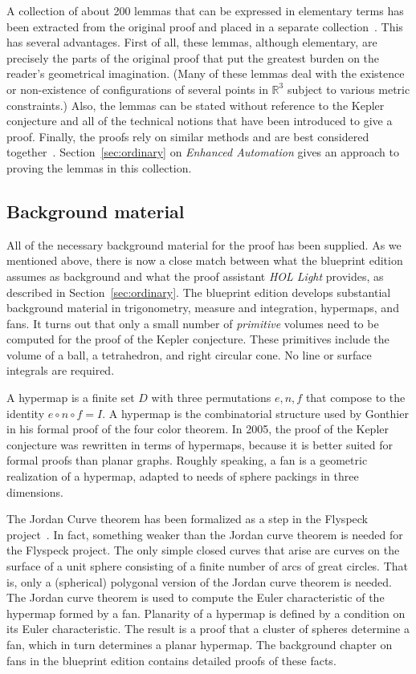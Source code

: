 \documentclass[11pt]{amsart}
\newcommand{\ring}[1]{\mathbb{#1}}
\begin{document}
A collection of about 200 lemmas that can be expressed in elementary terms has been extracted from 
the original proof and placed in a separate collection~\cite{hales:2008:collection}.  This has
several advantages.  First of all, these lemmas, although elementary, are precisely the parts of the
original proof that put the greatest burden on the reader's geometrical imagination.  (Many of these
lemmas deal with the existence or non-existence of configurations of several points in $\ring{R}^3$ subject to
various metric constraints.)  Also, the lemmas can be stated without reference to the Kepler conjecture and all of the
technical notions that have been introduced to give a proof.
Finally, the proofs rely on similar methods and are best considered
together~\cite{1271687}.  Section~\ref{sec:ordinary} on {\it Enhanced Automation} gives an approach to proving the lemmas in this collection.

 

\subsection*{Background material}

All of the necessary background material for the proof has been supplied.  As we mentioned above, there is now a close
match between what the blueprint edition assumes as background and what the proof assistant {\it HOL Light}
provides, as described in Section~\ref{sec:ordinary}.  The blueprint edition develops 
substantial background
material in trigonometry, measure and integration, hypermaps, and fans.   It turns out
that only a small number of {\it primitive} volumes need to be computed for the proof of the Kepler
conjecture. These primitives include the volume of a ball, a tetrahedron, and right circular cone.  
No line or surface integrals are required.

A hypermap is a finite set $D$ with three permutations $e,n,f$ that compose to the identity $e\circ n\circ f= I$.  A hypermap is the
combinatorial structure used by Gonthier in his formal proof of the four color theorem.  In 2005,
the proof of the Kepler conjecture was rewritten in terms of hypermaps, because it is better suited
for formal proofs than planar graphs.  Roughly speaking, a fan is a geometric realization of a hypermap,
adapted to needs of sphere packings in three dimensions.

The Jordan Curve theorem has been formalized as a step in the Flyspeck project~\cite{Hales:2007:jordan}.  In fact, something weaker than the Jordan curve theorem
is needed for the Flyspeck project.  The only simple closed curves that arise are curves on
the surface of a unit sphere consisting of a finite number of arcs of great circles.  That is,
only a (spherical) polygonal version of the Jordan curve theorem is needed.  The Jordan curve
theorem is used to compute the Euler characteristic of the hypermap formed by a fan.  Planarity of a hypermap is defined by a condition on its Euler characteristic.  The result is a proof that a cluster of spheres determine a fan, which in turn determines a planar hypermap.
The background chapter on fans in the blueprint edition contains detailed proofs of these facts.
\end{document}
